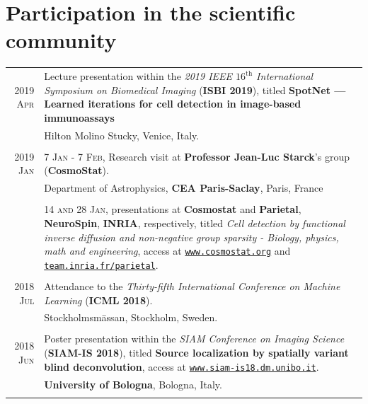 \documentclass[a4paper,10pt]{article}
\begin{document}
  \section{Participation in the scientific community}
    
    \vspace{-10pt}
    
    \begin{longtable}[H]{r|p{13.5cm}}
        
      \textsc{2019 Apr} & Lecture presentation within the \emph{2019 IEEE $16^{\mathrm{th}}$ International
			  Symposium on Biomedical Imaging} (\textbf{ISBI 2019}), titled 
			  \textbf{SpotNet --- Learned iterations for cell detection in image-based immunoassays}\\
			  & \footnotesize{Hilton Molino Stucky, Venice, Italy.} \\  
			  \multicolumn{2}{c}{} \\
			  
			  
    
      \textsc{2019 Jan} & \textsc{7 Jan - 7 Feb}, Research visit at \textbf{Professor Jean-Luc Starck}'s group (\textbf{CosmoStat}). \\
                        & \footnotesize{Department of Astrophysics, \textbf{CEA Paris-Saclay}, Paris, France} \\
                        & \\
                        & \textsc{14 and 28 Jan}, presentations at \textbf{Cosmostat} and \textbf{Parietal}, \textbf{NeuroSpin}, \textbf{INRIA}, respectively, titled \emph{Cell detection by functional inverse diffusion and non-negative group sparsity - Biology, physics, math and engineering}, access at \href{http://www.cosmostat.org/events/cosmoclub/cosmosclub-pol}{\texttt{www.cosmostat.org}} and \href{https://team.inria.fr/parietal/slides-of-pol-del-aguila-plas-talk-available-now-online/}{\texttt{team.inria.fr/parietal}}. \\
      \multicolumn{2}{c}{} \\
    
      \textsc{2018 Jul} & Attendance to the \emph{Thirty-fifth International Conference on Machine
						  Learning} (\textbf{ICML 2018}). \\
						& \footnotesize{Stockholmsm\"{a}ssan, Stockholm, Sweden.} \\
	  \multicolumn{2}{c}{} \\
						
      \textsc{2018 Jun} & Poster presentation within the \emph{SIAM Conference on Imaging Science}
			  (\textbf{SIAM-IS 2018}), titled \textbf{Source localization by spatially
			  variant blind deconvolution}, access at \href{https://www.siam-is18.dm.unibo.it/uploads/store/a7a8b242b168225d0be8998fa373f58b.pdf}{\texttt{www.siam-is18.dm.unibo.it}}. \\
			& \footnotesize{\textbf{University of Bologna}, Bologna, Italy.}\\
      \multicolumn{2}{c}{} \\
    

\end{longtable}
\end{document}
